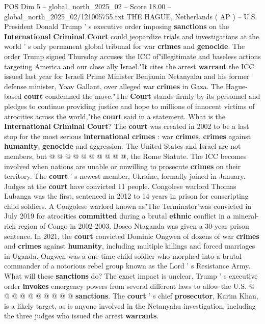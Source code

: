 \begin{textsample}{POS Dim 5 – global\_north\_2025\_02 – Score 18.00 – global\_north\_2025\_02/121005755.txt}  \label{ex:f5_pos_206}
THE HAGUE, Netherlands ( AP ) -- U.S.
President Donald Trump ' s executive order imposing \textbf{sanctions} on the \textbf{International} \textbf{Criminal} \textbf{Court} could jeopardize trials and investigations at the world ' s only permanent global tribunal for war \textbf{crimes} and \textbf{genocide}.
The order Trump signed Thursday accuses the ICC of"illegitimate and baseless actions targeting America and our close ally Israel."It cites the arrest \textbf{warrant} the ICC issued last year for Israeli Prime Minister Benjamin Netanyahu and his former defense minister, Yoav Gallant, over alleged war \textbf{crimes} in Gaza.
The Hague-based \textbf{court} condemned the move."The \textbf{Court} stands firmly by its personnel and pledges to continue providing justice and hope to millions of innocent victims of atrocities across the world,"the \textbf{court} said in a statement.
What is the \textbf{International} \textbf{Criminal} \textbf{Court}?
The \textbf{court} was created in 2002 to be a last stop for the most serious \textbf{international} \textbf{crimes} : war \textbf{crimes}, \textbf{crimes} against \textbf{humanity}, \textbf{genocide} and aggression.
The United States and Israel are not members, but @ @ @ @ @ @ @ @ @ @, the Rome Statute.
The ICC becomes involved when nations are unable or unwilling to prosecute \textbf{crimes} on their territory.
The \textbf{court} ' s newest member, Ukraine, formally joined in January.
Judges at the \textbf{court} have convicted 11 people.
Congolese warlord Thomas Lubanga was the first, sentenced in 2012 to 14 years in prison for conscripting child soldiers.
A Congolese warlord known as"The Terminator"was convicted in July 2019 for atrocities \textbf{committed} during a brutal \textbf{ethnic} conflict in a mineral-rich region of Congo in 2002-2003.
Bosco Ntaganda was given a 30-year prison sentence.
In 2021, the \textbf{court} convicted Dominic Ongwen of dozens of war \textbf{crimes} and \textbf{crimes} against \textbf{humanity}, including multiple killings and forced marriages in Uganda.
Ongwen was a one-time child soldier who morphed into a brutal commander of a notorious rebel group known as the Lord ' s Resistance Army.
What will these \textbf{sanctions} do?
The exact impact is unclear.
Trump ' s executive order \textbf{invokes} emergency powers from several different laws to allow the U.S. @ @ @ @ @ @ @ @ @ @ \textbf{sanctions}.
The \textbf{court} ' s chief \textbf{prosecutor}, Karim Khan, is a likely target, as is anyone involved in the Netanyahu investigation, including the three judges who issued the arrest \textbf{warrants}.

\end{textsample}
